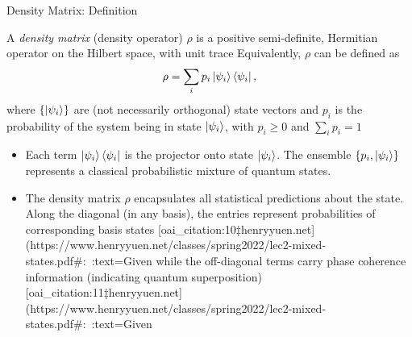 \begin{frame}{Density Matrix: Definition}
  \begin{definition}
    A \emph{density matrix} (density operator) $\rho$ is a positive semi-definite, Hermitian operator on the Hilbert space, with unit trace
    Equivalently, $\rho$ can be defined as 
    \[
       \rho = \sum_i p_i \ket{\psi_i}\bra{\psi_i},
    \] 
    where $\{ \ket{\psi_i} \}$ are (not necessarily orthogonal) state vectors and $p_i$ is the probability of the system being in state $\ket{\psi_i}$, with $p_i \ge 0$ and $\sum_i p_i = 1$
  \end{definition}
  \begin{itemize}
    \item Each term $\ket{\psi_i}\bra{\psi_i}$ is the projector onto state $\ket{\psi_i}$. The ensemble $\{p_i, \ket{\psi_i}\}$ represents a classical probabilistic mixture of quantum states.
    \item The density matrix $\rho$ encapsulates all statistical predictions about the state. Along the diagonal (in any basis), the entries represent probabilities of corresponding basis states [oai_citation:10‡henryyuen.net](https://www.henryyuen.net/classes/spring2022/lec2-mixed-states.pdf#:~:text=Given%
    while the off-diagonal terms carry phase coherence information (indicating quantum superposition) [oai_citation:11‡henryyuen.net](https://www.henryyuen.net/classes/spring2022/lec2-mixed-states.pdf#:~:text=Given%
  \end{itemize}
\end{frame}

